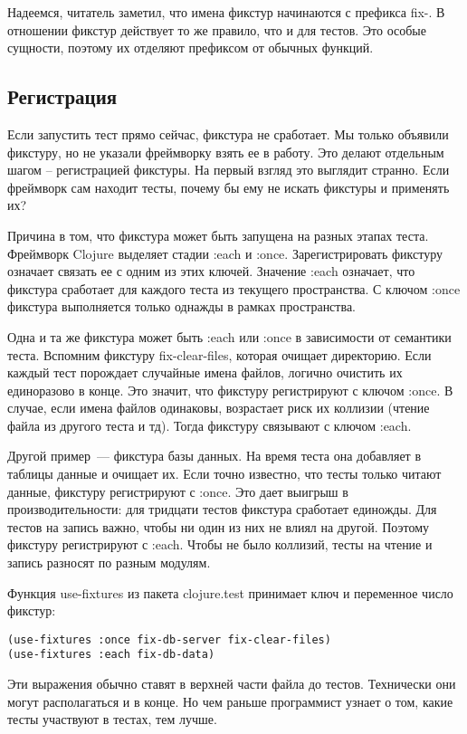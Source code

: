 Надеемся, читатель заметил, что имена фикстур начинаются с префикса fix-. В
отношении фикстур действует то же правило, что и для тестов. Это особые
сущности, поэтому их отделяют префиксом от обычных функций.

\subsection{Регистрация}

Если запустить тест прямо сейчас, фикстура не сработает. Мы только объявили
фикстуру, но не указали фреймворку взять ее в работу. Это делают отдельным шагом
-- регистрацией фикстуры. На первый взгляд это выглядит странно. Если фреймворк
сам находит тесты, почему бы ему не искать фикстуры и применять их?

Причина в том, что фикстура может быть запущена на разных этапах
теста. Фреймворк Clojure выделяет стадии :each и :once. Зарегистрировать
фикстуру означает связать ее с одним из этих ключей. Значение :each означает,
что фикстура сработает для каждого теста из текущего пространства. С ключом
:once фикстура выполняется только однажды в рамках пространства.

Одна и та же фикстура может быть :each или :once в зависимости от семантики
теста. Вспомним фикстуру fix-clear-files, которая очищает директорию. Если
каждый тест порождает случайные имена файлов, логично очистить их единоразово в
конце. Это значит, что фикстуру регистрируют с ключом :once. В случае, если
имена файлов одинаковы, возрастает риск их коллизии (чтение файла из другого
теста и тд). Тогда фикстуру связывают с ключом :each.

Другой пример~--- фикстура базы данных. На время теста она добавляет в таблицы
данные и очищает их. Если точно известно, что тесты только читают данные,
фикстуру регистрируют с :once. Это дает выигрыш в производительности: для
тридцати тестов фикстура сработает единожды. Для тестов на запись важно, чтобы
ни один из них не влиял на другой. Поэтому фикстуру регистрируют с :each. Чтобы
не было коллизий, тесты на чтение и запись разносят по разным модулям.

Функция use-fixtures из пакета clojure.test принимает ключ и переменное число
фикстур:

\begin{verbatim}
(use-fixtures :once fix-db-server fix-clear-files)
(use-fixtures :each fix-db-data)
\end{verbatim}

Эти выражения обычно ставят в верхней части файла до тестов. Технически они
могут располагаться и в конце. Но чем раньше программист узнает о том, какие
тесты участвуют в тестах, тем лучше.

